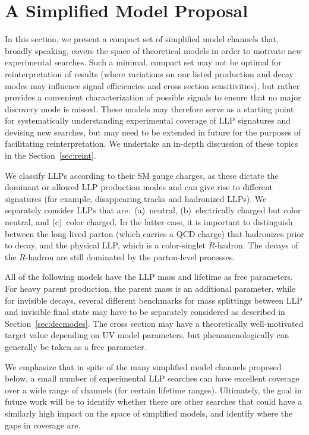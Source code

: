 \section{A Simplified Model Proposal}\label{sec:proposal}

In this section, we present a compact set of simplified model channels that, broadly speaking, covers the space of theoretical models in order to motivate new experimental searches. Such a minimal, compact set may not be optimal for reinterpretation of results (where variations on our listed production and decay modes may influence signal efficiencies and cross section sensitivities), but rather provides a convenient characterization of possible signals to ensure that no major discovery mode is missed. These models may therefore serve as a starting point for systematically understanding experimental coverage of LLP signatures and devising new searches, but may need to be extended in future for the purposes of facilitating reinterpretation. We undertake an in-depth discussion of these topics in the Section~\ref{sec:reint}.

We classify LLPs according to their SM gauge charges, as these dictate
the dominant or allowed LLP production modes and can give rise
to different signatures (for example, disappearing tracks and
hadronized LLPs). We separately consider LLPs that 
are:~(a)~neutral, (b)~electrically
charged but color neutral, and (c)~color charged. In the latter case,
it is important to distinguish between the long-lived parton (which carries a QCD charge)
that hadronizes prior to decay,
and the physical LLP, which is a color-singlet $R$-hadron. The decays of the $R$-hadron are 
still dominated by the parton-level processes.

All of the following models have the LLP mass and lifetime as free parameters. For heavy parent production, the parent mass is an additional parameter, while for invisible decays, several different benchmarks for mass splittings between LLP and invisible final state may have to be separately considered as described in Section~\ref{sec:decmodes}. The cross section may have  a theoretically well-motivated target value depending on  UV model parameters, but phenomenologically can generally be taken as a free parameter.

We emphasize that in spite of the many simplified model
channels proposed below, a small number of experimental LLP searches can
have excellent coverage over a wide range of channels (for certain lifetime ranges). Ultimately, the goal in future work will be
to  identify whether there are other searches that could
have a similarly high impact on the space of simplified models, and  identify where the gaps in coverage are.

